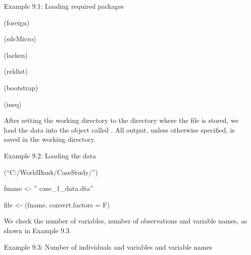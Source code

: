 \documentclass[letterpaper,10pt,english]{sphinxmanual}
\begin{document}
Example 9.1: Loading required packages

\begin{DUlineblock}{0em}
\item[] 
\item[] (foreign) 
\item[] (sdcMicro) 
\end{DUlineblock}

(laeken) 

(reldist) 

\begin{DUlineblock}{0em}
\item[] (bootstrap) 
\item[] (ineq) 
\end{DUlineblock}

After setting the working directory to the directory where the 
file is stored, we load the data into the object called . All
output, unless otherwise specified, is saved in the working directory.

Example 9.2: Loading the data

(“C:/WorldBank/CaseStudy/”) 

\begin{DUlineblock}{0em}
\item[] 
\item[] fname \textless{}- ” case\_1\_data.dta”
\item[] 
\item[] file \textless{}- (fname, convert.factors = F) 
\end{DUlineblock}

We check the number of variables, number of observations and variable
names, as shown in Example 9.3.

Example 9.3: Number of individuals and variables and variable names
\end{document}
